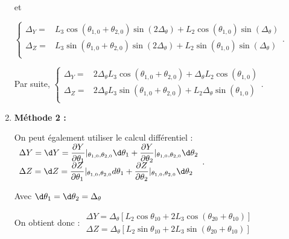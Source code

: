\begin{corrige}
\begin{enumerate}
et

$
\left\{
\begin{array}{ll}
\Delta_{Y}=&   L_3\cos \left(\theta_{1,0}+ \theta_{2,0}\right) \sin \left(2\Delta_{\theta} \right)
+ L_2 \cos \left(\theta_{1,0}\right) \sin \left(\Delta_{\theta} \right)\\
\Delta_{Z}=& L_3  \sin \left(\theta_{1,0} + \theta_{2,0}\right) \sin\left(2\Delta_{\theta} \right) 
+L_2 \sin \left(\theta_{1,0} \right) \sin\left(\Delta_{\theta} \right)\\
\end{array}.
\right.
$

Par suite, 
$
\left\{
\begin{array}{ll}
\Delta_{Y}=&  2\Delta_{\theta}  L_3\cos \left(\theta_{1,0}+ \theta_{2,0}\right) 
+\Delta_{\theta}  L_2 \cos \left(\theta_{1,0}\right) \\
\Delta_{Z}=& 2\Delta_{\theta} L_3  \sin \left(\theta_{1,0} + \theta_{2,0}\right)  
+L_2 \Delta_{\theta}\sin \left(\theta_{1,0} \right) \\
\end{array}.
\right.
$

\item \textbf{Méthode 2 : }

On peut également utiliser le calcul différentiel : 
$
\begin{array}{l}
\Delta Y=\d Y=\dfrac{\partial Y}{\partial \theta_1}\vert_{\theta_{1,0},\theta_{2,0}}\d\theta_1+\dfrac{\partial Y}{\partial \theta_2}\vert_{\theta_{1,0},\theta_{2,0}}\d\theta_2\\
\Delta Z=\d Z=\dfrac{\partial Z}{\partial \theta_1}\vert_{\theta_{1,0},\theta_{2,0}}d\theta_1+\dfrac{\partial Z}{\partial \theta_2}\vert_{\theta_{1,0},\theta_{2,0}}\d\theta_2\\
\end{array}.
$

Avec $\d\theta_1=\d\theta_2=\Delta_{\theta}$

On obtient donc : 
$
\begin{array}{l}
\Delta Y=\Delta_{\theta}\left[L_2\cos\theta_{10}+2L_3\cos(\theta_{20}+\theta_{10})\right]\\
\Delta Z=\Delta_{\theta}\left[L_2\sin\theta_{10}+2L_3\sin(\theta_{20}+\theta_{10})\right]
\end{array}
$
\end{enumerate}


\end{corrige}\else\fi


